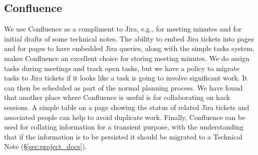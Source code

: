 \subsection{Confluence}
We use Confluence  as a compliment to Jira, e.g., for meeting minutes and for initial drafts of some technical notes.
The ability to embed Jira tickets into pages and for pages to have embedded Jira queries, along with the simple tasks system, makes Confluence an excellent choice for storing meeting minutes.
We do assign tasks during meetings and track open tasks, but we have a policy to migrate tasks to Jira tickets if it looks like a task is going to involve significant work.
It can then be scheduled as part of the normal planning process.
We have found that another place where Confluence is useful is for collaborating on hack sessions.
A simple table on a page showing the status of related Jira tickets and associated people can help to avoid duplicate work.
Finally, Confluence can be used for collating information for a transient purpose, with the understanding that if the information is to be persisted it should be migrated to a Technical Note (\S\ref{sec:project_docs}).
